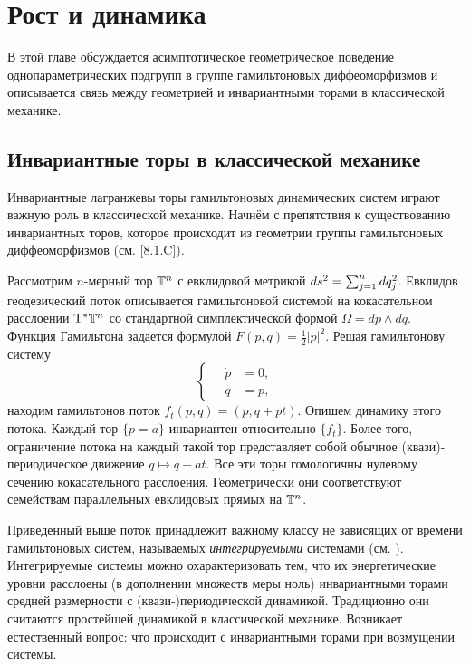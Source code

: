 \chapter{Рост и динамика}

В этой главе обсуждается асимптотическое геометрическое поведение
однопараметрических подгрупп в группе гамильтоновых диффеоморфизмов и
описывается связь между геометрией и инвариантными торами в
классической механике. 

\section{Инвариантные торы в классической механике}

Инвариантные лагранжевы торы гамильтоновых динамических систем играют
важную роль в классической механике. 
Начнём с препятствия к существованию инвариантных торов, которое
происходит из геометрии группы гамильтоновых диффеоморфизмов
(см. \ref{8.1.C}). 

Рассмотрим $n$-мерный тор $\mathbb{T}^n$ с евклидовой метрикой $ds^2 \z=
\sum^n_{j = 1} dq_j^2$. 
Евклидов геодезический поток описывается гамильтоновой системой на
кокасательном расслоении $\mathrm{T}^\ast \mathbb{T}^n$ со стандартной симплектической
формой $\Omega = dp \wedge dq$. 
Функция Гамильтона задается формулой $F (p, q) = \tfrac12 | p |^2$.
Решая гамильтонову систему 
\[
\begin{cases}
\quad\dot p &= 0,\\
\quad\dot q &= p,
\end{cases}
\]
находим гамильтонов поток $f_t (p, q) = (p, q + pt)$.
Опишем динамику этого потока.
Каждый тор $\{p = a\}$ инвариантен относительно $\{f_t\}$. 
Более того, ограничение потока на каждый такой тор представляет собой
обычное (квази)-периодическое движение $q \mapsto q + at$. 
Все эти торы гомологичны нулевому сечению кокасательного расслоения.
Геометрически они соответствуют семействам параллельных евклидовых
прямых на $\mathbb{T}^n$. 

Приведенный выше поток принадлежит важному классу не зависящих от
времени гамильтоновых систем, называемых \emph{интегрируемыми} системами
(см. \cite{Ar}). 
Интегрируемые системы можно охарактеризовать тем, что их
энергетические уровни расслоены (в дополнении множеств меры ноль)
инвариантными торами средней размерности с (квази-)периодической
динамикой. 
Традиционно они считаются простейшей динамикой в классической механике.
Возникает естественный вопрос: что происходит с инвариантными торами
при возмущении системы. 

